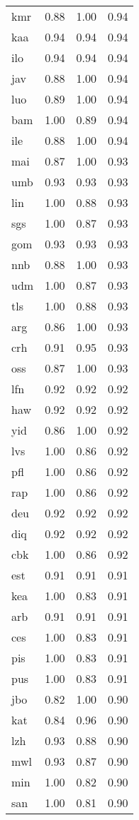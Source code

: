 \begin{table}
\begin{tabular}{lrrr}
kmr & 0.88 & 1.00 & 0.94 \\
kaa & 0.94 & 0.94 & 0.94 \\
ilo & 0.94 & 0.94 & 0.94 \\
jav & 0.88 & 1.00 & 0.94 \\
luo & 0.89 & 1.00 & 0.94 \\
bam & 1.00 & 0.89 & 0.94 \\
ile & 0.88 & 1.00 & 0.94 \\
mai & 0.87 & 1.00 & 0.93 \\
umb & 0.93 & 0.93 & 0.93 \\
lin & 1.00 & 0.88 & 0.93 \\
sgs & 1.00 & 0.87 & 0.93 \\
gom & 0.93 & 0.93 & 0.93 \\
nnb & 0.88 & 1.00 & 0.93 \\
udm & 1.00 & 0.87 & 0.93 \\
tls & 1.00 & 0.88 & 0.93 \\
arg & 0.86 & 1.00 & 0.93 \\
crh & 0.91 & 0.95 & 0.93 \\
oss & 0.87 & 1.00 & 0.93 \\
lfn & 0.92 & 0.92 & 0.92 \\
haw & 0.92 & 0.92 & 0.92 \\
yid & 0.86 & 1.00 & 0.92 \\
lvs & 1.00 & 0.86 & 0.92 \\
pfl & 1.00 & 0.86 & 0.92 \\
rap & 1.00 & 0.86 & 0.92 \\
deu & 0.92 & 0.92 & 0.92 \\
diq & 0.92 & 0.92 & 0.92 \\
cbk & 1.00 & 0.86 & 0.92 \\
est & 0.91 & 0.91 & 0.91 \\
kea & 1.00 & 0.83 & 0.91 \\
arb & 0.91 & 0.91 & 0.91 \\
ces & 1.00 & 0.83 & 0.91 \\
pis & 1.00 & 0.83 & 0.91 \\
pus & 1.00 & 0.83 & 0.91 \\
jbo & 0.82 & 1.00 & 0.90 \\
kat & 0.84 & 0.96 & 0.90 \\
lzh & 0.93 & 0.88 & 0.90 \\
mwl & 0.93 & 0.87 & 0.90 \\
min & 1.00 & 0.82 & 0.90 \\
san & 1.00 & 0.81 & 0.90 \\

\end{tabular}
\end{table}
